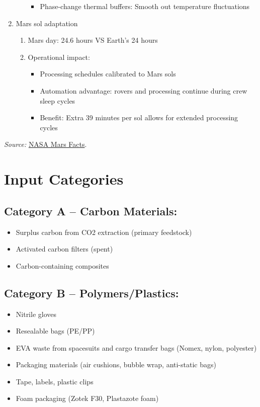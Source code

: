 \documentclass[12pt, a4paper]{article}
\begin{document}
\begin{enumerate}
\begin{enumerate}
\begin{itemize}
            \item Phase-change thermal buffers: Smooth out temperature fluctuations
        \end{itemize}
    \end{enumerate}
    \item Mars sol adaptation
    \begin{enumerate}
        \item Mars day: 24.6 hours VS Earth's 24 hours
        \item Operational impact:
        \begin{itemize}
            \item Processing schedules calibrated to Mars sols
            \item Automation advantage: rovers and processing continue during crew sleep cycles
            \item Benefit: Extra 39 minutes per sol allows for extended processing cycles
        \end{itemize}
    \end{enumerate}
\end{enumerate}

\noindent\textit{Source:} \href{https://science.nasa.gov/mars/facts/}{NASA Mars Facts}.

\section{Input Categories}

\subsection{Category A -- Carbon Materials:}
\begin{itemize}
    \item Surplus carbon from CO2 extraction (primary feedstock)
    \item Activated carbon filters (spent)
    \item Carbon-containing composites
\end{itemize}

\subsection{Category B -- Polymers/Plastics: }
\begin{itemize}
    \item Nitrile gloves
    \item Resealable bags (PE/PP)
    \item EVA waste from spacesuits and cargo transfer bags (Nomex, nylon, polyester)
    \item Packaging materials (air cushions, bubble wrap, anti-static bags)
    \item Tape, labels, plastic clips
    \item Foam packaging (Zotek F30, Plastazote foam)
\end{itemize}
\end{document}
